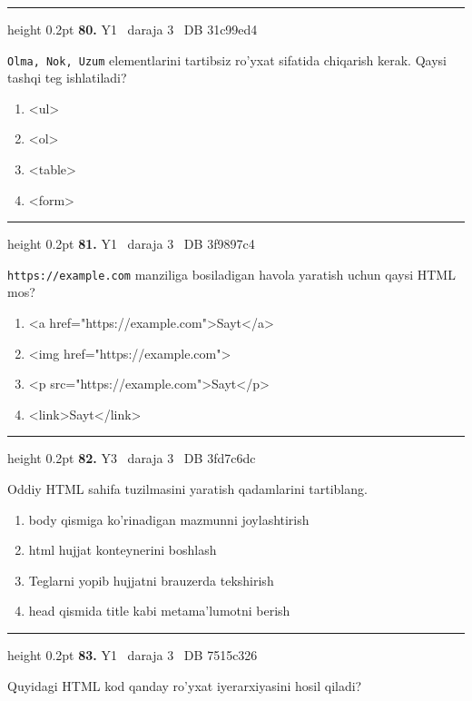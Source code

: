 \documentclass[10pt,a4paper,oneside]{article}
\begin{document}
\vspace{2mm}\hrule height 0.2pt \vspace{4mm}
\hypertarget{q80}{\textbf{\color{ink}80.}}  {\color{muted}\scriptsize Y1 \textbullet\ daraja 3 \textbullet\ DB 31c99ed4}
\par
\texttt{Olma, Nok, Uzum} elementlarini tartibsiz ro'yxat sifatida chiqarish kerak. Qaysi tashqi teg ishlatiladi?
\begin{enumerate}[label=\Alph*),leftmargin=9mm]
\item \textless{}ul\textgreater{}
\item \textless{}ol\textgreater{}
\item \textless{}table\textgreater{}
\item \textless{}form\textgreater{}
\end{enumerate}
\vspace{2mm}\hrule height 0.2pt \vspace{4mm}
\hypertarget{q81}{\textbf{\color{ink}81.}}  {\color{muted}\scriptsize Y1 \textbullet\ daraja 3 \textbullet\ DB 3f9897c4}
\par
\texttt{https://example.com} manziliga bosiladigan havola yaratish uchun qaysi HTML mos?
\begin{enumerate}[label=\Alph*),leftmargin=9mm]
\item \textless{}a href="https://example.com"\textgreater{}Sayt\textless{}/a\textgreater{}
\item \textless{}img href="https://example.com"\textgreater{}
\item \textless{}p src="https://example.com"\textgreater{}Sayt\textless{}/p\textgreater{}
\item \textless{}link\textgreater{}Sayt\textless{}/link\textgreater{}
\end{enumerate}
\vspace{2mm}\hrule height 0.2pt \vspace{4mm}
\hypertarget{q82}{\textbf{\color{ink}82.}}  {\color{muted}\scriptsize Y3 \textbullet\ daraja 3 \textbullet\ DB 3fd7c6dc}
\par
Oddiy HTML sahifa tuzilmasini yaratish qadamlarini tartiblang.
\begin{enumerate}[label=\Alph*),leftmargin=9mm]
\item body qismiga ko'rinadigan mazmunni joylashtirish
\item html hujjat konteynerini boshlash
\item Teglarni yopib hujjatni brauzerda tekshirish
\item head qismida title kabi metama'lumotni berish
\end{enumerate}
\vspace{2mm}\hrule height 0.2pt \vspace{4mm}
\hypertarget{q83}{\textbf{\color{ink}83.}}  {\color{muted}\scriptsize Y1 \textbullet\ daraja 3 \textbullet\ DB 7515c326}
\par
Quyidagi HTML kod qanday ro'yxat iyerarxiyasini hosil qiladi?
\end{document}
